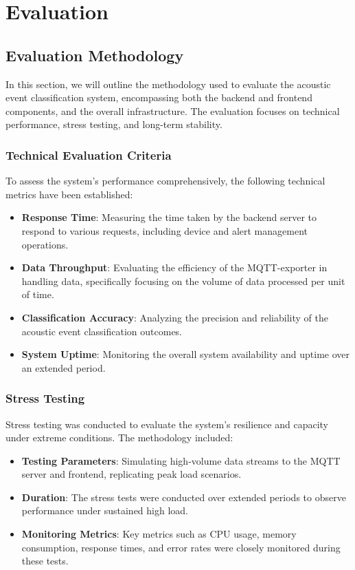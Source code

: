\chapter{Evaluation}
\section{Evaluation Methodology}
In this section, we will outline the methodology used to evaluate the acoustic event classification system, encompassing both the backend and frontend components, and the overall infrastructure. The evaluation focuses on technical performance, stress testing, and long-term stability.

\subsection{Technical Evaluation Criteria}
To assess the system's performance comprehensively, the following technical metrics have been established:

\begin{itemize}
  \item \textbf{Response Time}: Measuring the time taken by the backend server to respond to various requests, including device and alert management operations.
  \item \textbf{Data Throughput}: Evaluating the efficiency of the MQTT-exporter in handling data, specifically focusing on the volume of data processed per unit of time.
  \item \textbf{Classification Accuracy}: Analyzing the precision and reliability of the acoustic event classification outcomes.
  \item \textbf{System Uptime}: Monitoring the overall system availability and uptime over an extended period.
\end{itemize}
\subsection{Stress Testing}
Stress testing was conducted to evaluate the system's resilience and capacity under extreme conditions. The methodology included:

\begin{itemize}
  \item \textbf{Testing Parameters}: Simulating high-volume data streams to the MQTT server and frontend, replicating peak load scenarios.
  \item \textbf{Duration}: The stress tests were conducted over extended periods to observe performance under sustained high load.
  \item \textbf{Monitoring Metrics}: Key metrics such as CPU usage, memory consumption, response times, and error rates were closely monitored during these tests.
\end{itemize}

